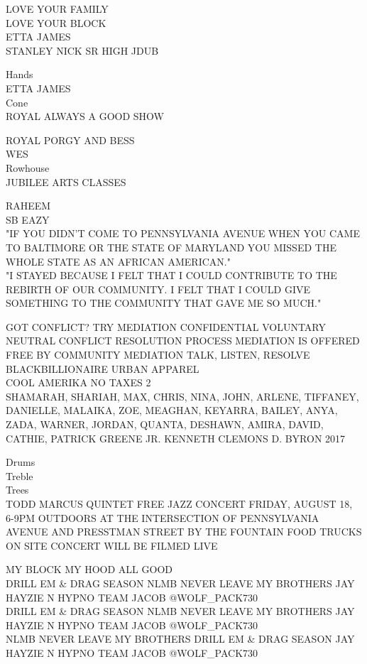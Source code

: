 \documentclass[10pt,letterpaper]{article}
\begin{document}
LOVE YOUR FAMILY\\
LOVE YOUR BLOCK\\
ETTA JAMES\\
STANLEY NICK SR HIGH JDUB

Hands\\
ETTA JAMES\\
Cone\\
ROYAL ALWAYS A GOOD SHOW

ROYAL PORGY AND BESS\\
WES\\
Rowhouse\\
JUBILEE ARTS CLASSES

RAHEEM\\
SB EAZY\\
"IF YOU DIDN'T COME TO PENNSYLVANIA AVENUE WHEN YOU CAME TO BALTIMORE OR THE STATE OF MARYLAND YOU MISSED THE WHOLE STATE AS AN AFRICAN AMERICAN."\\
"I STAYED BECAUSE I FELT THAT I COULD CONTRIBUTE TO THE REBIRTH OF OUR COMMUNITY.  I FELT THAT I COULD GIVE SOMETHING TO THE COMMUNITY THAT GAVE ME SO MUCH."

GOT CONFLICT?  TRY MEDIATION CONFIDENTIAL VOLUNTARY NEUTRAL CONFLICT RESOLUTION PROCESS MEDIATION IS OFFERED FREE BY COMMUNITY MEDIATION TALK, LISTEN, RESOLVE\\
BLACKBILLIONAIRE URBAN APPAREL\\
COOL AMERIKA NO TAXES 2\\
SHAMARAH, SHARIAH, MAX, CHRIS, NINA, JOHN, ARLENE, TIFFANEY, DANIELLE, MALAIKA, ZOE, MEAGHAN, KEYARRA, BAILEY, ANYA, ZADA, WARNER, JORDAN, QUANTA, DESHAWN, AMIRA, DAVID, CATHIE, PATRICK GREENE JR. KENNETH CLEMONS D. BYRON 2017

Drums\\
Treble\\
Trees\\
TODD MARCUS QUINTET FREE JAZZ CONCERT FRIDAY, AUGUST 18, 6{-}9PM OUTDOORS AT THE INTERSECTION OF PENNSYLVANIA AVENUE AND PRESSTMAN STREET BY THE FOUNTAIN FOOD TRUCKS ON SITE CONCERT WILL BE FILMED LIVE

MY BLOCK MY HOOD ALL GOOD\\
DRILL EM \& DRAG SEASON NLMB NEVER LEAVE MY BROTHERS JAY HAYZIE N HYPNO TEAM JACOB @WOLF\_PACK730\\
DRILL EM \& DRAG SEASON NLMB NEVER LEAVE MY BROTHERS JAY HAYZIE N HYPNO TEAM JACOB @WOLF\_PACK730\\
NLMB NEVER LEAVE MY BROTHERS DRILL EM \& DRAG SEASON JAY HAYZIE N HYPNO TEAM JACOB @WOLF\_PACK730
\end{document}
